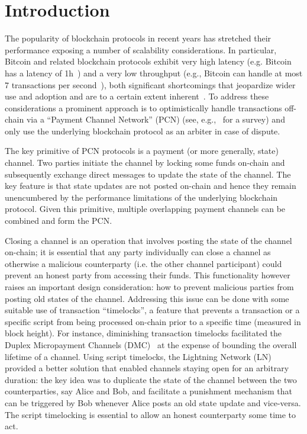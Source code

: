 \section{Introduction}
  The popularity of blockchain protocols 
  in recent years has stretched their
  performance  exposing a number of scalability considerations. 
In particular, 
Bitcoin and related blockchain protocols exhibit very high
  latency (e.g. Bitcoin has a latency of 1h~\cite{bitcoin}) 
  and a very low throughput (e.g., Bitcoin can handle at most 7
  transactions per second~\cite{scaling}), 
both significant shortcomings that jeopardize wider 
use and adoption and are to a certain extent inherent~\cite{scaling}.
To address these considerations
a prominent approach is to optimistically handle
  transactions off-chain via a ``Payment Channel Network'' 
  (PCN) (see, e.g.,~\cite{DBLP:conf/fc/GudgeonMRMG20} for a survey)
  and only use the underlying blockchain protocol as an
  arbiter in case of dispute.

The key primitive of PCN protocols is a 
payment (or more generally, state) channel. 
Two parties initiate the channel by locking
some funds on-chain and subsequently
exchange direct messages to update the state of the channel.
The key feature is that state updates are not posted on-chain
and hence they remain unencumbered by the performance limitations
of the underlying blockchain protocol. 
Given this primitive, multiple overlapping payment
channels can be combined and form the PCN. 

Closing a channel is an operation that involves posting the 
state of the channel on-chain; it is essential that any party
individually can close a channel as otherwise a malicious counterparty (i.e. the
other channel participant)
could prevent an honest party  from
accessing their funds. This functionality
however raises an important design consideration: how to prevent malicious parties from posting old states of the channel.
%
Addressing this issue can be done with some suitable use
of  transaction ``timelocks'', a feature that prevents a transaction
or a specific script from being processed on-chain
prior to a specific time (measured in block height). 
%
For instance, diminishing transaction timelocks
facilitated the Duplex Micropayment Channels (DMC)~\cite{decker}
at the expense of bounding the overall lifetime of a channel. 
Using script timelocks, the Lightning Network (LN)~\cite{lightning}
provided a better solution that enabled channels staying open
for an arbitrary duration: the key idea was to duplicate the
state of the channel between the two counterparties, say Alice and Bob, and facilitate a punishment mechanism that can be triggered by Bob whenever Alice posts an old state update and vice-versa. The script timelocking is essential to allow an honest counterparty some time to act.

